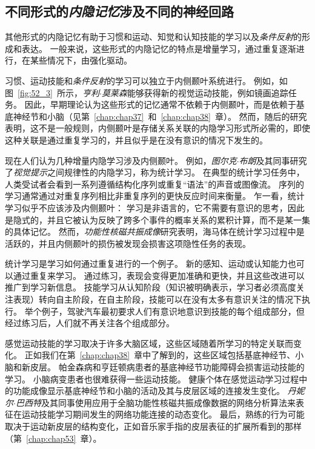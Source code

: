 \subsection{不同形式的\textit{内隐记忆}涉及不同的神经回路}

其他形式的内隐记忆有助于习惯和运动、知觉和认知技能的学习以及\textit{条件反射}的形成和表达。
一般来说，这些形式的内隐记忆的特点是增量学习，通过重复逐渐进行，在某些情况下，由强化驱动。


习惯、运动技能和\textit{条件反射}的学习可以独立于内侧颞叶系统进行。
例如，如图~\ref{fig:52_3}~所示，\textit{亨利$\cdot$莫莱森}能够获得新的视觉运动技能，例如镜画追踪任务。
因此，早期理论认为这些形式的记忆通常不依赖于内侧颞叶，而是依赖于基底神经节和小脑（见第~\ref{chap:chap37}~和~\ref{chap:chap38}~章）。
然而，随后的研究表明，这不是一般规则，内侧颞叶是存储关系关联的内隐学习形式所必需的，即使这种关联是通过重复学习的，并且似乎是在没有意识的情况下发生的。


现在人们认为几种增量内隐学习涉及内侧颞叶。
例如，\textit{图尔克$\cdot$布朗}及其同事研究了\textit{视觉提示}之间规律性的内隐学习，称为统计学习。
在典型的统计学习任务中，人类受试者会看到一系列遵循结构化序列或重复“语法”的声音或图像流。
序列的学习通常通过对重复序列相比非重复序列的更快反应时间来衡量。
乍一看，统计学习似乎不应该涉及内侧颞叶：
学习是非语言的，它不需要有意识的思考，因此是隐式的，并且它被认为反映了跨多个事件的概率关系的累积计算，而不是某一集的具体记忆。
然而，\textit{功能性核磁共振成像}研究表明，海马体在统计学习过程中是活跃的，并且内侧颞叶的损伤被发现会损害这项隐性任务的表现。


统计学习是学习如何通过重复进行的一个例子。
新的感知、运动或认知能力也可以通过重复来学习。
通过练习，表现会变得更加准确和更快，并且这些改进可以推广到学习新信息。
技能学习从认知阶段（知识被明确表示，学习者必须高度关注表现）转向自主阶段，在自主阶段，技能可以在没有太多有意识关注的情况下执行。
举个例子，驾驶汽车最初要求人们有意识地意识到技能的每个组成部分，但经过练习后，人们就不再关注各个组成部分。


感觉运动技能的学习取决于许多大脑区域，这些区域随着所学习的特定关联而变化。
正如我们在第~\ref{chap:chap38}~章中了解到的，这些区域包括基底神经节、小脑和新皮层。
帕金森病和亨廷顿病患者的基底神经节功能障碍会损害运动技能的学习。
小脑病变患者也很难获得一些运动技能。
健康个体在感觉运动学习过程中的功能成像显示基底神经节和小脑的活动及其与皮层区域的连接发生变化。
\textit{丹妮尔$\cdot$巴西特}及其同事使用应用于全脑功能性核磁共振成像数据的网络分析算法来表征在运动技能学习期间发生的网络功能连接的动态变化。
最后，熟练的行为可能取决于运动新皮层的结构变化，正如音乐家手指的皮层表征的扩展所看到的那样（第~\ref{chap:chap53}~章）。



